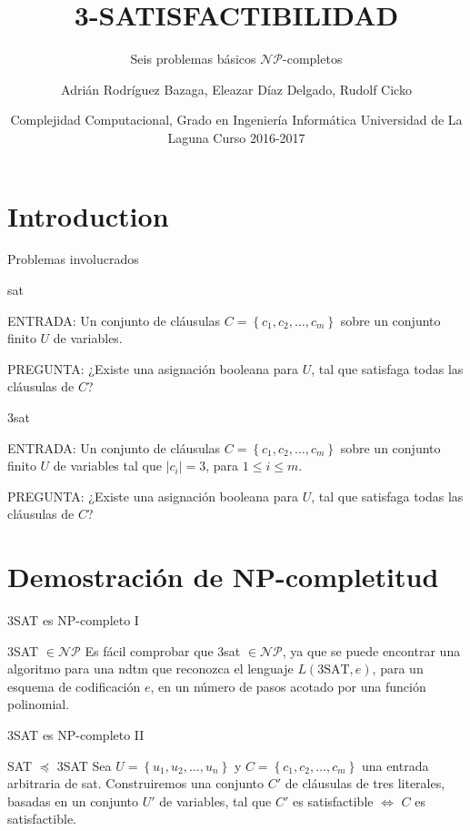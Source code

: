 \documentclass[10pt, mathserif, profesionalfont]{beamer}
\title{3-SATISFACTIBILIDAD}
\subtitle{Seis problemas básicos $\mathcal{NP}$-completos}
\author{Adrián Rodríguez Bazaga, Eleazar Díaz Delgado, Rudolf Cicko}
\institute[Universidad de La Laguna]{Adrián Rodríguez Bazaga, Eleazar Díaz Delgado \and Rudolf Cicko} %
\date{Complejidad Computacional, Grado en Ingeniería Informática \newline Universidad de La Laguna \newline Curso 2016-2017}
\begin{document}
\begin{frame}
  \titlepage
\end{frame}



\section{Introduction}


\begin{frame}{Problemas involucrados}
    
\begin{block}{\gls{sat}}
{\small 
\noindent ENTRADA: Un conjunto de cláusulas $C=\left \{c_1, c_2, \dots, c_m \right \}$ sobre un conjunto finito $U$ de variables.

\noindent PREGUNTA: ¿Existe una asignación booleana para $U$, tal que satisfaga todas las cláusulas de $C$? 
}
\end{block}

\begin{block}{\gls{3sat}}
{\small
\noindent ENTRADA: Un conjunto de cláusulas $C=\left \{c_1, c_2, \dots, c_m \right \}$ sobre un conjunto finito $U$ de variables tal que $|c_i|=3$, para $1\le i \le m$.

\noindent PREGUNTA: ¿Existe una asignación booleana para $U$, tal que satisfaga todas las cláusulas de $C$? 
}
\end{block}


\end{frame}


\section{Demostración de NP-completitud}

\begin{frame}{3SAT es NP-completo I}
    
\begin{block}{3SAT $\in \mathcal{NP}$}    
Es fácil comprobar que \gls{3sat}	$\in \mathcal{NP}$, ya que se puede encontrar una algoritmo para una \gls{ndtm} que reconozca el lenguaje $L(\mbox{3SAT},e)$, para un esquema de codificación $e$, en un número de pasos acotado por una función polinomial.

\end{block}

\end{frame}

\begin{frame}{3SAT es NP-completo II}
    
\begin{block}{SAT $\preceq$ 3SAT}    
Sea $U=\left \{u_1, u_2, \dots, u_n  \right\}$  y $C=\left \{c_1, c_2, \dots, c_m \right \}$ una entrada arbitraria de \gls{sat}. Construiremos una conjunto $C'$ de cláusulas de tres literales, basadas en un conjunto $U'$ de variables, tal que $C'$ es satisfactible $\Leftrightarrow$ $C$ es satisfactible.
\end{block}

\end{frame}
\end{document}
